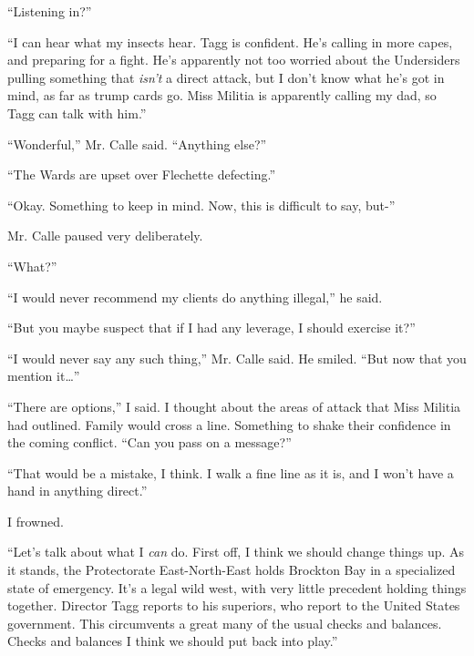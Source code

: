 ``Listening in?''



``I can hear what my insects hear.  Tagg is confident.  He's calling in more capes, and preparing for a fight.  He's apparently not too worried about the Undersiders pulling something that \emph{isn't} a direct attack, but I don't know what he's got in mind, as far as trump cards go.  Miss Militia is apparently calling my dad, so Tagg can talk with him.''



``Wonderful,'' Mr. Calle said.  ``Anything else?''



``The Wards are upset over Flechette defecting.''



``Okay.  Something to keep in mind.  Now, this is difficult to say, but-''



Mr. Calle paused very deliberately.



``What?''



``I would never recommend my clients do anything illegal,'' he said.



``But you maybe suspect that if I had any leverage, I should exercise it?''



``I would never say any such thing,'' Mr. Calle said.  He smiled.  ``But now that you mention it\ldots''



``There are options,'' I said.  I thought about the areas of attack that Miss Militia had outlined.  Family would cross a line.  Something to shake their confidence in the coming conflict.  ``Can you pass on a message?''



``That would be a mistake, I think.  I walk a fine line as it is, and I won't have a hand in anything direct.''



I frowned.



``Let's talk about what I \emph{can} do.  First off, I think we should change things up.  As it stands, the Protectorate East-North-East holds Brockton Bay in a specialized state of emergency.  It's a legal wild west, with very little precedent holding things together.  Director Tagg reports to his superiors, who report to the United States government.  This circumvents a great many of the usual checks and balances.  Checks and balances I think we should put back into play.''



